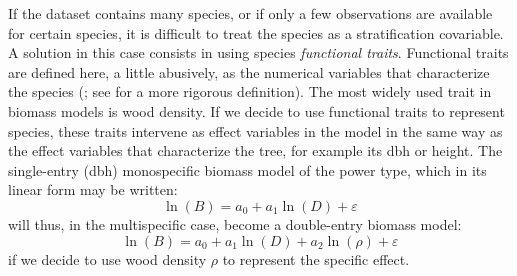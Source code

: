 If the dataset contains many species, or if only a few observations are available for certain species, it is difficult to treat the species as a stratification covariable. A solution in this case consists in using species \emph{functional traits}. Functional traits are defined here, a little abusively, as the numerical variables that characterize the species (\citealp{diaz97,rosch97,lavorel02}; see \citealp{violle07} for a more rigorous definition). The most widely used trait in biomass models is wood density. If we decide to use functional traits to represent species, these traits intervene as effect variables in the model in the same way as the effect variables that characterize the tree, for example its dbh or height. The single-entry (dbh) monospecific biomass model of the power type, which in its linear form may be written:
\[
\ln(B)=a_0+a_1\ln(D)+\varepsilon
\]
will thus, in the multispecific case, become a double-entry biomass model:
\[
\ln(B)=a_0+a_1\ln(D)+a_2\ln(\rho)+\varepsilon
\]
if we decide to use wood density $\rho$ to represent the specific effect.

